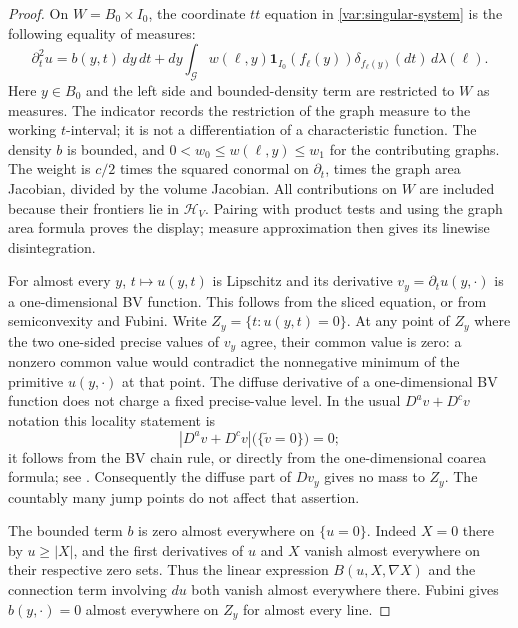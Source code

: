 \begin{proof}
On $W=B_0\times I_0$, the coordinate $tt$ equation in
\eqref{var:singular-system} is the following equality of measures:
\begin{equation}\label{var:graph-disintegration}
 \partial_t^2u
 =b(y,t)\,dy\,dt+
   dy\int_{\mathcal G}w(\ell,y)
       \mathbf1_{I_0}(f_\ell(y))
       \delta_{f_\ell(y)}(dt)\,d\lambda(\ell).
\end{equation}
Here $y\in B_0$ and the left side and bounded-density term are
restricted to $W$ as measures.  The indicator records the restriction
of the graph measure to the working $t$-interval; it is not a
differentiation of a characteristic function.  The density $b$ is
bounded, and $0<w_0\leq w(\ell,y)\leq w_1$ for the contributing
graphs.  The weight is $c/2$ times the squared conormal on
$\partial_t$, times the graph area Jacobian, divided by the volume
Jacobian.  All contributions on $W$ are included because their
frontiers lie in $\mathcal H_V$.  Pairing with product tests and
using the graph area formula proves the display; measure
approximation then gives its linewise disintegration.

For almost every $y$, $t\mapsto u(y,t)$ is Lipschitz and its
derivative $v_y=\partial_tu(y,\cdot)$ is a one-dimensional BV
function.  This follows from the sliced equation, or from
semiconvexity and Fubini.  Write
$Z_y=\{t:u(y,t)=0\}$.  At any point of $Z_y$ where the two
one-sided precise values of $v_y$ agree, their common value is
zero: a nonzero common value would contradict the nonnegative
minimum of the primitive $u(y,\cdot)$ at that point.
The diffuse derivative of a one-dimensional BV function does
not charge a fixed precise-value level.  In the usual
$D^av+D^cv$ notation this locality statement is
\begin{equation}\label{var:BV-level-locality}
 |D^av+D^cv|\bigl(\{\widetilde v=0\}\bigr)=0;
\end{equation}
it follows from the BV chain rule, or directly from the
one-dimensional coarea formula; see
\cite[Proposition~8, equation~(16)]{AmbrosioDeLellisMaly2007}.
Consequently the diffuse part of $Dv_y$ gives no mass to $Z_y$.
The countably many jump points do not affect that assertion.

The bounded term $b$ is zero almost everywhere on $\{u=0\}$.
Indeed $X=0$ there by $u\geq|X|$, and the first derivatives of
$u$ and $X$ vanish almost everywhere on their respective zero
sets.  Thus the linear expression $B(u,X,\nabla X)$ and the
connection term involving $du$ both vanish almost everywhere
there.  Fubini gives $b(y,\cdot)=0$ almost everywhere on $Z_y$
for almost every line.


\end{proof}
